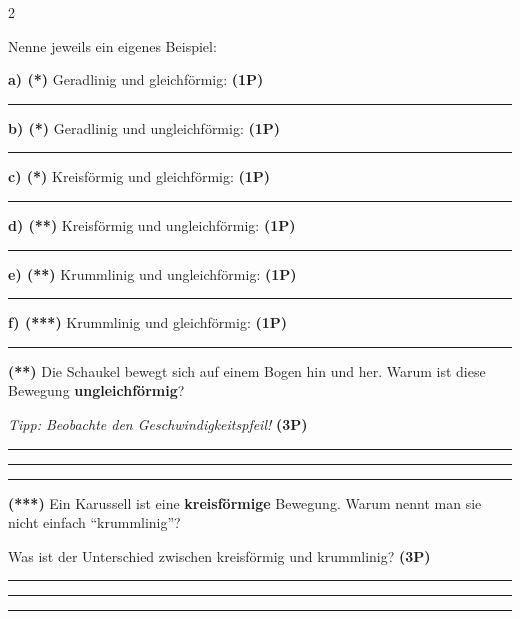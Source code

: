 \documentclass[11pt,a4paper]{article}
\begin{document}
\begin{multicols}{2}
\begin{tcolorbox}[title={5: Eigene Beispiele aus dem Alltag}]
\small
Nenne jeweils ein eigenes Beispiel:

\vspace{2mm}
\textbf{a) (*)} Geradlinig und gleichförmig: \textbf{(1P)}

\vspace{5mm}
\hrule

\vspace{3mm}
\textbf{b) (*)} Geradlinig und ungleichförmig: \textbf{(1P)}

\vspace{5mm}
\hrule

\vspace{3mm}
\textbf{c) (*)} Kreisförmig und gleichförmig: \textbf{(1P)}

\vspace{5mm}
\hrule

\vspace{3mm}
\textbf{d) (**)} Kreisförmig und ungleichförmig: \textbf{(1P)}

\vspace{5mm}
\hrule

\vspace{3mm}
\textbf{e) (**)} Krummlinig und ungleichförmig: \textbf{(1P)}

\vspace{5mm}
\hrule

\vspace{3mm}
\textbf{f) (***)} Krummlinig und gleichförmig: \textbf{(1P)}

\vspace{5mm}
\hrule
\end{tcolorbox}

\begin{tcolorbox}[title={6: Vertiefung Schaukel}]
\small
\textbf{(**)} Die Schaukel bewegt sich auf einem Bogen hin und her. Warum ist diese Bewegung \textbf{ungleichförmig}? 

\textit{Tipp: Beobachte den Geschwindigkeitspfeil!} \textbf{(3P)}

\vspace{8mm}
\hrule
\vspace{6mm}
\hrule
\vspace{6mm}
\hrule
\end{tcolorbox}

\begin{tcolorbox}[title={7: Transferaufgabe}]
\small
\textbf{(***)} Ein Karussell ist eine \textbf{kreisförmige} Bewegung. Warum nennt man sie nicht einfach "`krummlinig"'? 

Was ist der Unterschied zwischen kreisförmig und krummlinig? \textbf{(3P)}

\vspace{8mm}
\hrule
\vspace{6mm}
\hrule
\vspace{6mm}
\hrule
\end{tcolorbox}

\end{multicols}
\end{document}
